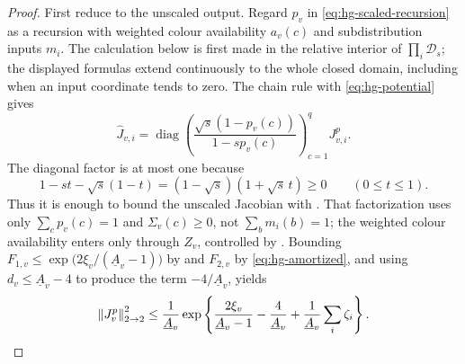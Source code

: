 \begin{proof}
First reduce to the unscaled output.  Regard \(p_v\) in
\eqref{eq:hg-scaled-recursion} as a recursion with weighted colour
availability \(a_v(c)\) and subdistribution inputs \(m_i\).
The calculation below is first made in the relative interior of
$\prod_i\mathcal D_s$; the displayed formulas extend continuously to
the whole closed domain, including when an input coordinate tends to zero.
The chain rule with \eqref{eq:hg-potential} gives
\begin{equation}
 \widehat J_{v,i}
 =\operatorname{diag}\left(
   \frac{\sqrt s(1-p_v(c))}{1-sp_v(c)}
  \right)_{c=1}^q J^p_{v,i}.
 \label{eq:hg-scaled-row-factor}
\end{equation}
The diagonal factor is at most one because
\[
  1-st-\sqrt s(1-t)
   =(1-\sqrt s)(1+\sqrt s\,t)\ge0
  \qquad(0\le t\le1).
\]
Thus it is enough to bound the unscaled Jacobian with
.  That factorization uses only
\(\sum_cp_v(c)=1\) and \(\Sigma_v(c)\ge0\), not \(\sum_bm_i(b)=1\); the weighted
colour availability enters only through \(Z_v\), controlled by
.
Bounding \(F_{1,v}\le
\exp\bigl(2\xi_v/(\underline A_v-1)\bigr)\) by
 and \(F_{2,v}\) by
\eqref{eq:hg-amortized}, and using
\(d_v\le\underline A_v-4\) to produce the term
\(-4/\underline A_v\), yields
\begin{equation}
 \left\|J^p_v\right\|_{2\to2}^2
 \le\frac1{\underline A_v}
 \exp\left\{
   \frac{2\xi_v}{\underline A_v-1}-\frac4{\underline A_v}
   +\frac1{\underline A_v}\sum_i\zeta_i
 \right\}.
 \label{eq:hg-euclidean-jacobian}
\end{equation}


\end{proof}
